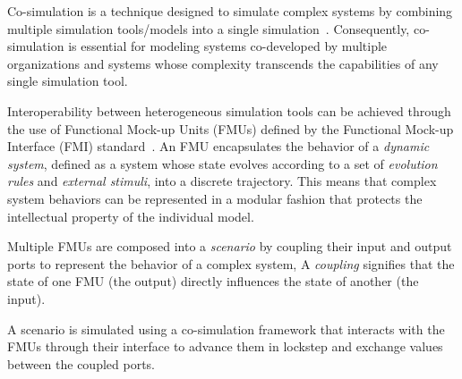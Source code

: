 Co-simulation is a technique designed to simulate complex systems by combining multiple simulation tools/models into a single simulation~\cite{Gomes2018,Kubler2000}.
Consequently, co-simulation is essential for modeling systems co-developed by multiple organizations and systems whose complexity transcends the capabilities of any single simulation tool.

Interoperability between heterogeneous simulation tools can be achieved through the use of Functional Mock-up Units (FMUs) defined by the Functional Mock-up Interface (FMI) standard~\cite{FMI2014}.
An FMU encapsulates the behavior of a \emph{dynamic system}, defined as a system whose state evolves according to a set of \emph{evolution rules} and \emph{external stimuli}, into a discrete trajectory.
This means that complex system behaviors can be represented in a modular fashion that protects the intellectual property of the individual model.

Multiple FMUs are composed into a \emph{scenario} by coupling their input and output ports to represent the behavior of a complex system,
A \emph{coupling} signifies that the state of one FMU (the output) directly influences the state of another (the input).

A scenario is simulated using a co-simulation framework that interacts with the FMUs through their interface to advance them in lockstep and exchange values between the coupled ports.
